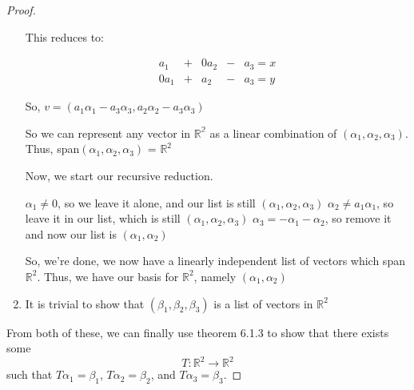 \documentclass[12pt,letterpaper]{article}
\begin{document}
\begin{proof}
\begin{enumerate}
        This reduces to:

        \begin{align*}
          a_1 & + & 0a_2 & - & a_3 = x \\
          0a_1 & + & a_2 & - & a_3 = y
        \end{align*}

        So, $v = (a_1\alpha_1 - a_3\alpha_3, a_2\alpha_2 - a_3\alpha_3)$

        So we can represent any vector in $\mathbb{R^2}$ as a linear combination
        of $(\alpha_1, \alpha_2, \alpha_3)$.
        Thus, span$(\alpha_1, \alpha_2, \alpha_3)$ = $\mathbb{R}^2$

        Now, we start our recursive reduction.

        $\alpha_1 \neq 0$, so we leave it alone, and our list is still $(\alpha_1, \alpha_2, \alpha_3)$
        $\alpha_2 \neq a_1\alpha_1$, so leave it in our list, which is still $(\alpha_1, \alpha_2, \alpha_3)$
        $\alpha_3 = -\alpha_1 - \alpha_2$, so remove it and now our list is $(\alpha_1, \alpha_2)$

        So, we're done, we now have a linearly independent list of vectors which span $\mathbb{R}^2$.
        Thus, we have our basis for $\mathbb{R}^2$, namely $(\alpha_1, \alpha_2)$

      \item
        It is trivial to show that $(\beta_1, \beta_2, \beta_3)$ is a list of vectors in $\mathbb{R}^2$

    \end{enumerate}

    From both of these, we can finally use theorem 6.1.3 to show that there exists some
    \[T: \mathbb{R}^2 \rightarrow \mathbb{R}^2\]
    such that $T\alpha_1 = \beta_1$, $T\alpha_2 = \beta_2$, and $T\alpha_3 = \beta_3$.
  \end{proof}
\end{document}

